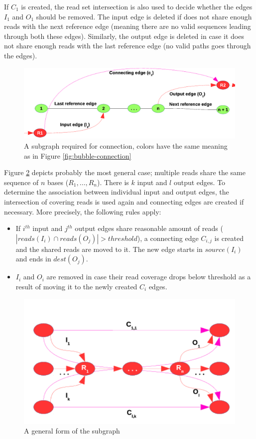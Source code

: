 If $C_1$ is created, the read set intersection is also used to decide whether the edges $I_1$ and $O_1$ should be removed. The input edge is deleted if does not share enough reads with the next reference edge (meaning there are no valid sequences leading through both these edges). Similarly, the output edge is deleted in case it does not share enough reads with the last reference edge (no valid paths goes through the edges).

\begin{figure}[h]
	\centering
	\includegraphics{img/connection-general.pdf}
	\caption{A subgraph required for connection, colors have the same meaning as in Figure \ref{fig:bubble-connection}}
	\label{fig:connection-general}
\end{figure}

Figure \ref{fig:connection-abstract} depicts probably the most general case; multiple reads share the same sequence of $n$ bases ($R_1, \ldots, R_n$). There is $k$ input and $l$ output edges. To determine the association between individual input and output edges, the intersection of covering reads is used again and connecting edges are created if necessary. More precisely, the following rules apply:
\begin{itemize}
\item If $i^{th}$ input and $j^{th}$ output edges share reasonable amount of reads ($|reads(I_i) \cap reads(O_j)| > threshold$), a connecting edge $C_{i,j}$ is created and the shared reads are moved to it. The new edge starts in $source(I_i)$ and ends in $dest(O_j)$.
\item $I_i$ and $O_i$ are removed in case their read coverage drops below threshold as a result of moving it to the newly created $C_i$ edges. 
\end{itemize}

\begin{figure}[h]
	\centering
	\includegraphics{img/connection-abstract.pdf}
	\caption{A general form of the subgraph}
	\label{fig:connection-abstract}
\end{figure}

